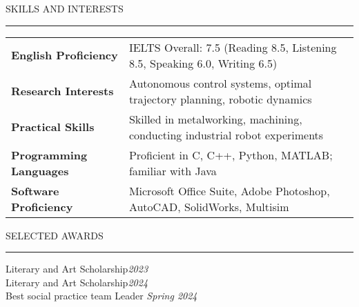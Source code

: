 \documentclass{resume} %
\renewenvironment{rSection}[1]{
\sectionskip
\textcolor{TsinghuaPurple}{\MakeUppercase{#1}}
\sectionlineskip
\hrule
\begin{list}{}{
\setlength{\leftmargin}{0em}
}
\item[]
}{
\end{list}
}
\begin{document}
  




\begin{rSection}{SKILLS AND INTERESTS}

    \begin{tabular}{ @{} >{\bfseries}l @{\hspace{6ex}} l }  
    English Proficiency & IELTS Overall: 7.5 (Reading 8.5, Listening 8.5, Speaking 6.0, Writing 6.5)\\
    Research Interests & Autonomous control systems, optimal trajectory planning, robotic dynamics\\    
    Practical Skills & Skilled in metalworking, machining, conducting industrial robot experiments\\
    Programming Languages & Proficient in C, C++, Python, MATLAB; familiar with Java\\
    Software Proficiency & Microsoft Office Suite, Adobe Photoshop, AutoCAD, SolidWorks, Multisim\\
    \end{tabular}   
    
\end{rSection}




\begin{rSection}{Selected awards} \itemsep -2pt
{Literary and Art Scholarship}\hfill {\em 2023} \\
{Literary and Art Scholarship}\hfill {\em 2024} \\
{Best social practice team Leader} \hfill {\em Spring 2024}
\end{rSection}
\end{document}
